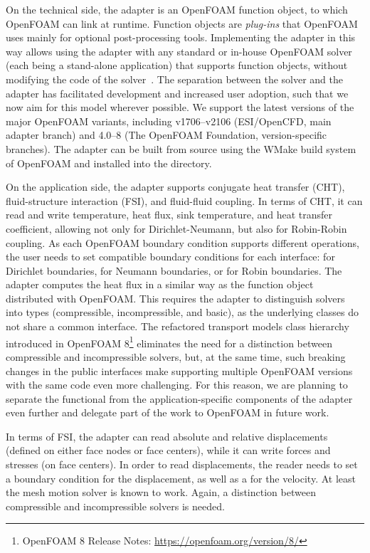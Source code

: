 On the technical side, the adapter is an OpenFOAM function object, to which OpenFOAM can link at runtime.
Function objects are \emph{plug-ins} that OpenFOAM uses mainly for optional post-processing tools.
Implementing the adapter in this way allows using the adapter with any standard or in-house OpenFOAM solver (each being a stand-alone application) that supports function objects, without modifying the code of the solver~\cite{Chourdakis2017}.
The separation between the solver and the adapter has facilitated development and increased user adoption, such that we now aim for this model wherever possible. We support the latest versions of the major OpenFOAM variants,
including v1706--v2106 (ESI/OpenCFD, main adapter branch) and 4.0--8 (The OpenFOAM Foundation, version-specific branches).
The adapter can be built from source using the WMake build system of OpenFOAM and installed into the  directory.

On the application side, the adapter supports conjugate heat transfer (CHT), fluid-structure interaction (FSI), and fluid-fluid coupling. 
In terms of CHT, it can read and write temperature, heat flux, sink temperature, and heat transfer coefficient, 
allowing not only for Dirichlet-Neumann, but also for Robin-Robin coupling.
As each OpenFOAM boundary condition supports different operations, the user needs to set compatible boundary conditions for
each interface:  for Dirichlet boundaries,  for Neumann boundaries, or  for Robin boundaries.
The adapter computes the heat flux in a similar way as the  function object distributed with OpenFOAM.
This requires the adapter to distinguish solvers into types (compressible, incompressible, and basic),
as the underlying classes do not share a common interface.
The refactored transport models class hierarchy introduced in OpenFOAM 8\footnote{OpenFOAM 8 Release Notes: \url{https://openfoam.org/version/8/}}
eliminates the need for a distinction between compressible and incompressible solvers,
but, at the same time, such breaking changes in the public interfaces make supporting multiple OpenFOAM versions with the same code even more challenging.
For this reason, we are planning to separate the functional from the application-specific components of the adapter even further
and delegate part of the work to OpenFOAM in future work.

In terms of FSI, the adapter can read absolute and relative displacements (defined on either face nodes or face centers), while it can write forces and stresses (on face centers).
In order to read displacements, the reader needs to set a  boundary condition for the displacement, as well as a 
for the velocity. At least the mesh motion solver  is known to work.
Again, a distinction between compressible and incompressible solvers is needed.

